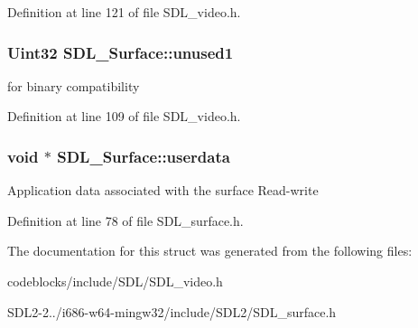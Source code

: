 Definition at line 121 of file S\+D\+L\+\_\+video.\+h.

\hypertarget{structSDL__Surface_a41066cf7cc91d2f032dd0f29cc418ec4}{
\subsubsection[{unused1}]{\setlength{\rightskip}{0pt plus 5cm}Uint32 S\+D\+L\+\_\+\+Surface\+::unused1}}\label{structSDL__Surface_a41066cf7cc91d2f032dd0f29cc418ec4}
for binary compatibility 

Definition at line 109 of file S\+D\+L\+\_\+video.\+h.

\hypertarget{structSDL__Surface_a2716a62d5f26e233e2835e002491821b}{
\subsubsection[{userdata}]{\setlength{\rightskip}{0pt plus 5cm}void $\ast$ S\+D\+L\+\_\+\+Surface\+::userdata}}\label{structSDL__Surface_a2716a62d5f26e233e2835e002491821b}
Application data associated with the surface Read-\/write 

Definition at line 78 of file S\+D\+L\+\_\+surface.\+h.



The documentation for this struct was generated from the following files\+:\begin{DoxyCompactItemize}
\item 
codeblocks/include/\+S\+D\+L/S\+D\+L\+\_\+video.\+h\item 
S\+D\+L2-\/2../i686-\/w64-\/mingw32/include/\+S\+D\+L2/S\+D\+L\+\_\+surface.\+h\end{DoxyCompactItemize}
